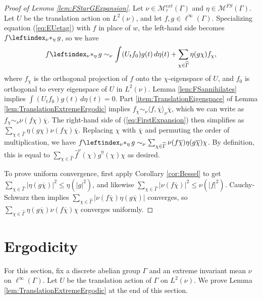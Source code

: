 \documentclass[12pt]{amsart} \usepackage{amsmath,centernot,amssymb,leftindex}
\numberwithin{theorem}{section}
\numberwithin{equation}{section}
\theoremstyle{definition}
\begin{document}
\begin{proof}[Proof of Lemma \ref{lem:FStarGExpansion}]
Let $\nu\in \mathcal M_{\tau}^{ext}(\Gamma)$ and $\eta\in \mathcal M^{FS}(\Gamma)$.  Let $U$ be the translation action on $L^{2}(\nu)$, and let $f, g\in \ell^{\infty}(\Gamma)$.  Specializing equation (\ref{eq:EUetag}) with $f$ in place of $w$, the left-hand side becomes $f\leftindex_{\nu}{*}_{\eta}\, g$, so we have
\begin{equation}\label{eq:FirstExpansion}
	f\leftindex_{\nu}{*}_{\eta}\, g \sim_{\nu} \int (U_{t}f_{0}) g(t)\, d\eta(t) + \sum_{\chi\in \widehat{\Gamma}} \eta(g\chi)f_{\chi},
\end{equation}
where $f_{\chi}$ is the orthogonal projection of $f$ onto the $\chi$-eigenspace of $U$, and $f_{0}$ is orthogonal to every eigenspace of $U$ in $L^{2}(\nu)$.  Lemma \ref{lem:FSannihilates} implies  $\int (U_{t}f_{0}) g(t)\, d\eta(t)=0$. Part \ref{item:TranslationEigenspace} of Lemma \ref{lem:TranslationExtremeErgodic}  implies $f_{\chi}\sim_{\nu}\langle f,\overline{\chi}\rangle_{\nu}\overline{\chi}$, which we can write as $f_{\chi}\sim_{\nu}\nu(f\chi)\overline{\chi}$.  The right-hand side of  (\ref{eq:FirstExpansion}) then simplifies as $\sum_{\chi\in\widehat{\Gamma}} \eta(g\chi)\nu(f\chi)\overline{\chi}$.  Replacing $\chi$ with $\overline{\chi}$ and permuting the order of multiplication, we have $f\leftindex_{\nu}{*}_{\eta}\, g \sim_{\nu}\sum_{\chi\in\widehat{\Gamma}} \nu(f\overline{\chi})\eta(g\overline{\chi})\chi$.  By definition, this is equal to $\sum_{\chi\in\widehat{\Gamma}} \hat{f}^\nu(\chi)\hat{g}^\eta(\chi)\chi$ as desired.

To prove uniform convergence, first apply Corollary \ref{cor:Bessel} to get $\sum_{\chi\in\widehat{\Gamma}}|\eta(g\overline{\chi})|^{2}\leq \eta(|g|^{2})$, and likewise $\sum_{\chi\in\widehat{\Gamma}} |\nu(f\overline{\chi})|^{2}\leq \nu(|f|^{2})$.   Cauchy-Schwarz then implies $\sum_{\chi\in\widehat{\Gamma}} |\nu(f\overline{\chi})\eta(g\overline{\chi})|$ converges, so $\sum_{\chi\in\widehat{\Gamma}} \eta(g\overline{\chi})\nu(f\overline{\chi})\chi$ converges uniformly.
\end{proof}


\section{Ergodicity}\label{sec:Ergodicity}
For this section, fix a discrete abelian group $\Gamma$ and an extreme invariant mean $\nu$ on $\ell^{\infty}(\Gamma)$. Let $U$ be the translation action of $\Gamma$ on $L^{2}(\nu)$.  We prove Lemma \ref{lem:TranslationExtremeErgodic} at the end of this section.
\end{document}
